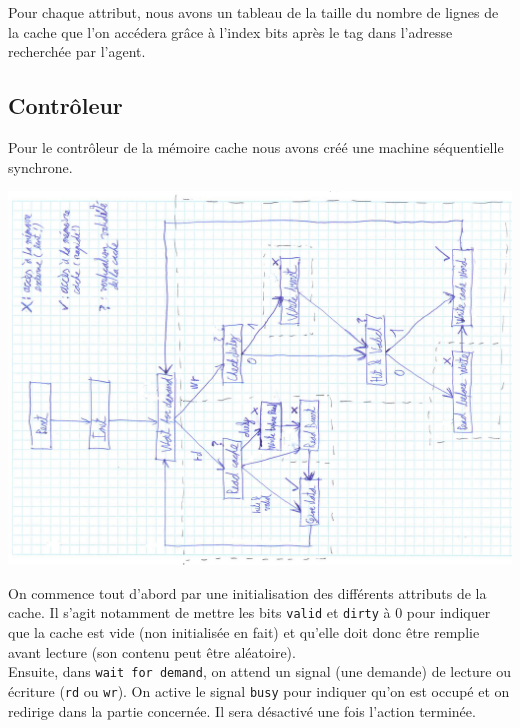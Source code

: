 \documentclass[10pt,a4paper]{article}
\begin{document}
Pour chaque attribut, nous avons un tableau de la taille du nombre de lignes de la cache que l'on accédera grâce à l'index bits après le tag dans l'adresse recherchée par l'agent.

\newpage

\subsection{Contrôleur}
Pour le contrôleur de la mémoire cache nous avons créé une machine séquentielle synchrone.

\begin{center}

\includegraphics[width=1.3\textwidth, angle=-90]{images/mss}

\end{center}

\newpage

On commence tout d'abord par une initialisation des différents attributs de la cache. Il s'agit notamment de mettre les bits \texttt{valid} et \texttt{dirty} à 0 pour indiquer que la cache est vide (non initialisée en fait) et qu'elle doit donc être remplie avant lecture (son contenu peut être aléatoire).\\

Ensuite, dans \texttt{wait for demand}, on attend un signal (une demande) de lecture ou écriture (\texttt{rd} ou \texttt{wr}). On active le signal \texttt{busy} pour indiquer qu'on est occupé et on redirige dans la partie concernée. Il sera désactivé une fois l'action terminée.
\end{document}
